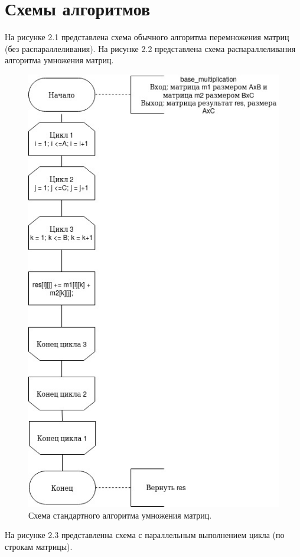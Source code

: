 \documentclass[12pt]{report}
\begin{document}
\section{Схемы алгоритмов}
На рисунке 2.1 представлена схема обычного алгоритма перемножения матриц (без распараллеливания). На рисунке 2.2 представлена схема распараллеливания алгоритма умножения матриц.


\begin{figure}[hp!]
	\centering
	\includegraphics[scale=0.5]{report_files/base.jpg}
	\caption{Схема стандартного алгоритма умножения матриц.}
	\label{fig:mpr}
\end{figure}
\newpage
На рисунке 2.3 представленна схема с параллельным выполнением цикла (по строкам матрицы).
\end{document}
